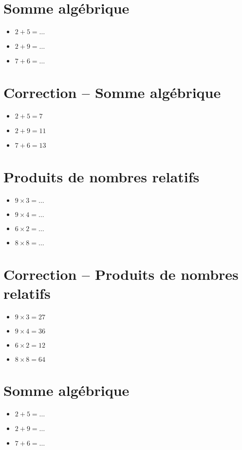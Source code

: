 \documentclass[a4paper,11pt,fleqn]{article}
\begin{document}
\pagestyle{empty}


\section{Somme algébrique}
\begin{itemize}

3
3
3
3
3
3
3
3
3
3
  \item $2+5=\ldots$
  \item $2+9=\ldots$
  \item $7+6=\ldots$
\end{itemize}

\section{Correction -- Somme algébrique}
\begin{itemize}

  \item $2+5=7$
  \item $2+9=11$
  \item $7+6=13$
\end{itemize}

\section{Produits de nombres relatifs}
\begin{itemize}

  \item $9\times3=\ldots$
  \item $9\times4=\ldots$
  \item $6\times2=\ldots$
  \item $8\times8=\ldots$
\end{itemize}

\section{Correction -- Produits de nombres relatifs}
\begin{itemize}

  \item $9\times3=27$
  \item $9\times4=36$
  \item $6\times2=12$
  \item $8\times8=64$
\end{itemize}
\newpage
\setcounter{exo}{0}
\setcounter{section}{0}
\section{Somme algébrique}
\begin{itemize}

3
3
3
3
3
3
3
3
3
3
  \item $2+5=\ldots$
  \item $2+9=\ldots$
  \item $7+6=\ldots$
\end{itemize}
\end{document}

